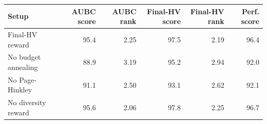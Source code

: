 \begin{tabular}{lrrrrr}
\toprule
Setup & AUBC score & AUBC rank & Final-HV score & Final-HV rank & Perf. score \\
\midrule
Final-HV reward & 95.4 & 2.25 & 97.5 & 2.19 & 96.4 \\
No budget annealing & 88.9 & 3.19 & 95.2 & 2.94 & 92.0 \\
No Page-Hinkley & 91.1 & 2.50 & 93.1 & 2.62 & 92.1 \\
No diversity reward & 95.6 & 2.06 & 97.8 & 2.25 & 96.7 \\
\bottomrule
\end{tabular}
